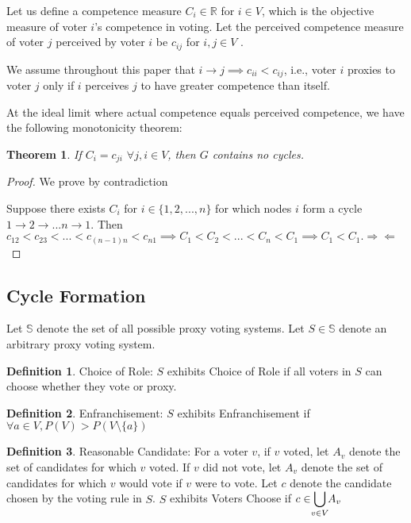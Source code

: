 \documentclass[10pt]{article}
\newtheorem{theorem}{Theorem}[section]
\theoremstyle{definition}
\newtheorem{definition}{Definition}[section]
\newcommand{\bb}[1]{\mathbb{#1}}
\begin{document}
Let us define a competence measure $C_i \in \mathbb{R}$ for $ i \in V$, which is the objective measure of voter $i$'s competence in voting. Let the perceived competence measure of voter $j$ perceived by voter $i$ be $c_{ij}$ for $i, j \in V$ . 

We assume throughout this paper that $i \rightarrow j \implies c_{ii} < c_{ij}$, i.e., voter $i$ proxies to voter $j$ only if $i$ perceives $j$ to have greater competence than itself.


At the ideal limit where actual competence equals perceived competence, we have the following monotonicity theorem:

\begin{theorem}

If $C_i = c_{ji}$ $\forall j, i \in V$, then $G$ contains no cycles.

\end{theorem}

\begin{proof}

We prove by contradiction

Suppose there exists $C_i$ for $i \in \{1, 2, ..., n\}$ for which nodes $i$ form a cycle $1 \rightarrow 2 \rightarrow ... n \rightarrow 1$. Then $c_{12} < c_{23 }< ... < c_{(n-1)n} < c_{n1} \implies C_1 < C_2 < ... < C_n < C_1 \implies C_1 < C_1. \Rightarrow\Leftarrow$
\end{proof}

\subsection{Cycle Formation}
Let $\bb{S}$ denote the set of all possible proxy voting systems. Let $S \in \bb{S}$ denote an arbitrary proxy voting system.


\theoremstyle{definition}
\begin{definition}{Choice of Role:}
$S$ exhibits Choice of Role if all voters in $S$ can choose whether they vote or proxy.
\end{definition}

\theoremstyle{definition}
\begin{definition}{Enfranchisement:}
$S$ exhibits Enfranchisement if $\forall a \in V, P(V) > P(V\setminus\{a\})$
\end{definition}

\theoremstyle{definition}
\begin{definition}{Reasonable Candidate:}
For a voter $v$, if $v$ voted, let $A_v$ denote the set of candidates for which $v$ voted. If $v$ did not vote, let $A_v$ denote the set of candidates for which $v$ would vote if $v$ were to vote. Let $c$ denote the candidate chosen by the voting rule in $S$. $S$ exhibits Voters Choose if $c \in \smashoperator{\bigcup\limits_{v \in V}}A_v$ 
\end{definition}
\end{document}
